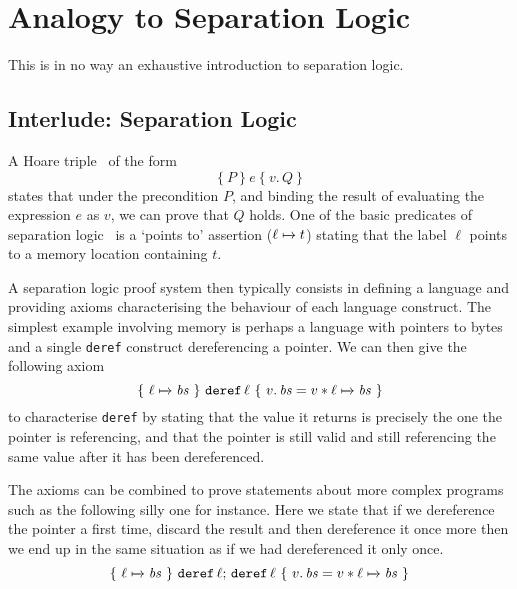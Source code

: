 \section{Analogy to Separation Logic}\label{appendix:hoare}

This is in no way an exhaustive introduction to separation logic.

\newcommand{\Pointer}[3]{\ensuremath{#1 \xmapsto{#2} #3}}
\newcommand{\Hoare}[4]{\ensuremath{\lbrace~ #1 ~\rbrace~ #2 ~\lbrace~ #3.\, #4 ~\rbrace}}
\newcommand{\Meaning}[2]{\ensuremath{\llbracket \,#1\, \rrbracket\, (\Mu{#2})}}
\newcommand{\Mu}[1]{\ensuremath{\mu \, \mathit{#1}}}

\subsection{Interlude: Separation Logic}

A Hoare triple~\cite{DBLP:journals/cacm/Hoare69} of the form
\[ \Hoare{P}{e}{v}{Q} \]
states that under the precondition
$P$, and binding the result of evaluating the expression $e$ as $v$,
we can prove that $Q$ holds.
%
One of the basic predicates of separation logic~\cite{DBLP:conf/lics/Reynolds02}
is a `points to' assertion (\Pointer{\ell}{}{t}) stating that
the label $\ell$ points to a memory location containing $t$.

A separation logic proof system then typically consists in defining
a language and providing axioms characterising the behaviour of
each language construct.
%
The simplest example involving memory is perhaps a language
with pointers to bytes and a single \texttt{deref} construct
dereferencing a pointer.
%
We can then give the following axiom
\[ \Hoare{\Pointer{\ell}{}{\mathit{bs}}}{\texttt{deref}\,\ell}{v}{\mathit{bs} = v \ast \Pointer{\ell}{}{\mathit{bs}}} \]
to characterise \texttt{deref} by stating that the value
it returns is precisely the one the pointer is referencing,
and that the pointer is still valid and still referencing
the same value after it has been dereferenced.

The axioms can be combined to prove statements about more
complex programs such as the following silly one for instance.
Here we state that if we dereference the pointer a first time,
discard the result and then dereference it once more then we
end up in the same situation as if we had dereferenced it only once.
\[ \Hoare{\Pointer{\ell}{}{\mathit{bs}}}{\texttt{deref}\,\ell;\, \texttt{deref}\,\ell}{v}{\mathit{bs} = v \ast \Pointer{\ell}{}{\mathit{bs}}} \]

